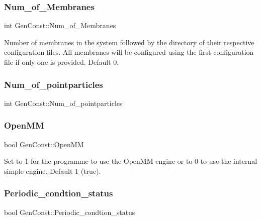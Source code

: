 \subsubsection{\texorpdfstring{Num\_of\_Membranes}{Num\_of\_Membranes}}
{\footnotesize\ttfamily int Gen\+Const\+::\+Num\+\_\+of\+\_\+\+Membranes}

Number of membranes in the system followed by the directory of their respective configuration files. All membranes will be configured using the first configuration file if only one is provided. Default 0. \mbox{\label{namespaceGenConst_aec456997dd27bb5eb5c636fbc78f39fc}} 
\subsubsection{\texorpdfstring{Num\_of\_pointparticles}{Num\_of\_pointparticles}}
{\footnotesize\ttfamily int Gen\+Const\+::\+Num\+\_\+of\+\_\+pointparticles}

\mbox{\label{namespaceGenConst_abcb46238d30411769a54de2a308a9717}} 
\subsubsection{\texorpdfstring{OpenMM}{OpenMM}}
{\footnotesize\ttfamily bool Gen\+Const\+::\+Open\+MM}

Set to 1 for the programme to use the Open\+MM engine or to 0 to use the internal simple engine. Default 1 (true). \mbox{\label{namespaceGenConst_a5c58935925954afa6c36447bc71802f5}} 
\subsubsection{\texorpdfstring{Periodic\_condtion\_status}{Periodic\_condtion\_status}}
{\footnotesize\ttfamily bool Gen\+Const\+::\+Periodic\+\_\+condtion\+\_\+status}

\mbox{\label{namespaceGenConst_accb4df9604e3e9efe42479d91e6bbb55}} 
